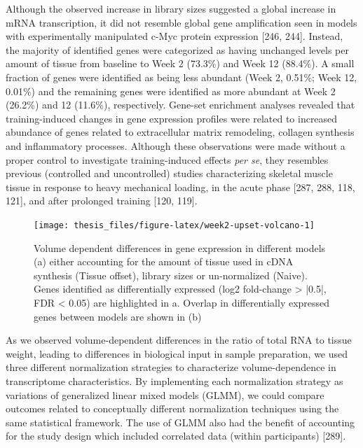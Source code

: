 \documentclass[twoside,10pt]{gihclass} %
\begin{document}
Although the observed increase in library sizes suggested a global increase in mRNA transcription, it did not resemble global gene amplification seen in models with experimentally manipulated c-Myc protein expression
{[}246, 244{]}.
Instead, the majority of identified genes were categorized as having unchanged levels per amount of tissue from baseline to Week 2 (73.3\%) and Week 12 (88.4\%). A small fraction of genes were identified as being less abundant (Week 2, 0.51\%; Week 12, 0.01\%) and the remaining genes were identified as more abundant at Week 2 (26.2\%) and 12 (11.6\%), respectively.
Gene-set enrichment analyses revealed that training-induced changes in gene expression profiles were related to increased abundance of genes related to extracellular matrix remodeling, collagen synthesis and inflammatory processes. Although these observations were made without a proper control to investigate training-induced effects \emph{per se}, they resembles previous (controlled and uncontrolled) studies characterizing skeletal muscle tissue in response to heavy mechanical loading, in the acute phase
{[}287, 288, 118, 121{]},
and after prolonged training {[}120, 119{]}.
\begin{figure}

{\centering \texttt{[image: thesis\_files/figure-latex/week2-upset-volcano-1]} 

}

\caption[General patterns of differentially expressed genes at Week 2]{Volume dependent differences in gene expression in different models (a) either accounting for the amount of tissue used in cDNA synthesis (Tissue offset), library sizes or un-normalized (Naive). Genes identified as differentially expressed (log2 fold-change > |0.5|, FDR < 0.05) are highlighted in a.  Overlap in differentially expressed genes between models are shown in (b)}\label{fig:week2-upset-volcano}
\end{figure}
As we observed volume-dependent differences in the ratio of total RNA to tissue weight, leading to differences in biological input in sample preparation, we used three different normalization strategies to characterize volume-dependence in transcriptome characteristics.
By implementing each normalization strategy as variations of generalized linear mixed models (GLMM), we could compare outcomes related to conceptually different normalization techniques using the same statistical framework.
The use of GLMM also had the benefit of accounting for the study design which included correlated data (within participants)
{[}289{]}.
\end{document}

